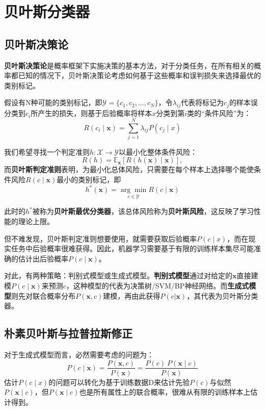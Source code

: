 \chapter{贝叶斯分类器}

\section{贝叶斯决策论}\label{sec:7.1}
\textbf{贝叶斯决策论}是概率框架下实施决策的基本方法，对于分类任务，在所有相关的概率都已知的情况下，贝叶斯决策论考虑如何基于这些概率和误判损失来选择最优的类别标记。

假设有N种可能的类别标记，即$\mathcal{Y} = \{c_1, c_2, ...,c_N \}$，令$\lambda _{i j}$代表将标记为$c_j$的样本误分类到$c_i$所产生的损失，则基于后验概率将样本$x$分类到第$i$类的“条件风险”为：
\[
R\left(c_{i} \mid \boldsymbol{x}\right)=\sum_{j=1}^{N} \lambda_{i j} P\left(c_{j} \mid x\right)
\]

我们希望寻找一个判定准则$h:\mathcal{X\to Y}$以最小化整体条件风险：
\[
R(h) = \mathbb{E}_ {\boldsymbol x}[R(h(\boldsymbol x) \mid\boldsymbol x)],
\]
而\textbf{贝叶斯判定准则}表明，为最小化总体风险，只需要在每个样本上选择哪个能使条件风险$R(c\mid\boldsymbol x)$最小的类别标记，即\[
h^{*}(\boldsymbol{x})=\underset{c \in \mathcal{Y}}{\arg \min } R(c \mid \boldsymbol{x})
\]

此时的$h^*$被称为\textbf{贝叶斯最优分类器}，该总体风险称为\textbf{贝叶斯风险}，这反映了学习性能的理论上限。

但不难发现，贝叶斯判定准则想要使用，就需要获取后验概率$P(c\mid x)$，而在现实任务中后验概率很难获得。因此，机器学习需要基于有限的训练样本集尽可能准确的估计出后验概率$P(c\mid \boldsymbol x)$。

对此，有两种策略：判别式模型或生成式模型。\textbf{判别式模型}通过对给定的$\boldsymbol{x}$直接建模$P(c\mid \boldsymbol x)$来预测$c$，这种模型的代表为决策树/SVM/BP神经网络。而\textbf{生成式模型}则先对联合概率分布$P(\boldsymbol x, c)$建模，再由此获得$P(c|\boldsymbol x)$，其代表为贝叶斯分类器。

\section{朴素贝叶斯与拉普拉斯修正}\label{sec:7.2}
对于生成式模型而言，必然需要考虑的问题为：
\[
P(c \mid \boldsymbol{x})=\frac{P(\boldsymbol{x},c)}{P(\boldsymbol{x})} = \frac{P(c)\ P(\boldsymbol{x}\mid c)}{P(\boldsymbol{x})}
\]
估计$P(c \mid x)$的问题可以转化为基于训练数据D来估计先验$P(c)$与似然$P(\boldsymbol x\mid c)$，但$P(\boldsymbol x\mid c)$也是所有属性上的联合概率，很难从有限的训练样本上估计得到。

